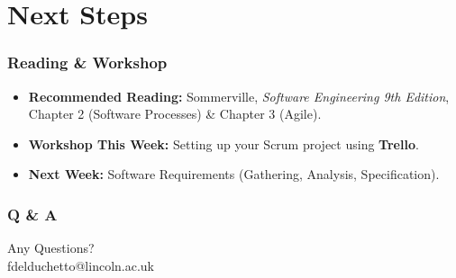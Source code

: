 \documentclass[xcolor=table]{beamer}
\begin{document}
\section{Next Steps}

\begin{frame}
    \frametitle{Reading \& Workshop}
    \begin{itemize}
        \item \textbf{Recommended Reading:} 
        Sommerville, \textit{Software Engineering 9th Edition}, Chapter 2 (Software Processes) \& Chapter 3 (Agile).
        \item \textbf{Workshop This Week:}
        Setting up your Scrum project using \textbf{Trello}.
        \item \textbf{Next Week:}
        Software Requirements (Gathering, Analysis, Specification).
    \end{itemize}
\end{frame}

\begin{frame}
    \frametitle{Q \& A}
    \begin{center}
        \Huge Any Questions?\\\vspace{0.5cm} 
        \normalsize fdelduchetto@lincoln.ac.uk
    \end{center}
\end{frame}
\end{document}
